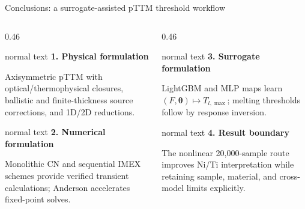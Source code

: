 \documentclass[aspectratio=169,10pt]{beamer}
\begin{document}
\begin{frame}[t]{Conclusions: a surrogate-assisted pTTM threshold workflow}
  \vspace{-0.12cm}
  \begin{columns}[T,totalwidth=0.94\textwidth]
    \begin{column}{0.46\textwidth}
      \begin{beamercolorbox}[wd=\linewidth,sep=0.54em]{normal text}
        \scriptsize
        \textbf{\color{GVSourceBlue}1. Physical formulation}\par
        Axisymmetric pTTM with optical/thermophysical closures, ballistic and finite-thickness source corrections, and 1D/2D reductions.
      \end{beamercolorbox}
      \vspace{0.14cm}
      \begin{beamercolorbox}[wd=\linewidth,sep=0.54em]{normal text}
        \scriptsize
        \textbf{\color{GVDiffusionGreen}2. Numerical formulation}\par
        Monolithic CN and sequential IMEX schemes provide verified transient calculations; Anderson accelerates fixed-point solves.
      \end{beamercolorbox}
    \end{column}
    \begin{column}{0.46\textwidth}
      \begin{beamercolorbox}[wd=\linewidth,sep=0.54em]{normal text}
        \scriptsize
        \textbf{\color{GVCapacityPurple}3. Surrogate formulation}\par
        LightGBM and MLP maps learn \((F,\boldsymbol\theta)\mapsto T_{l,\max}\); melting thresholds follow by response inversion.
      \end{beamercolorbox}
      \vspace{0.14cm}
      \begin{beamercolorbox}[wd=\linewidth,sep=0.54em]{normal text}
        \scriptsize
        \textbf{\color{GVCouplingOrange}4. Result boundary}\par
        The nonlinear 20,000-sample route improves Ni/Ti interpretation while retaining sample, material, and cross-model limits explicitly.
      \end{beamercolorbox}
    \end{column}
  \end{columns}
  \vspace{0.28cm}
  \begin{center}

\end{center}
\end{frame}
\end{document}
